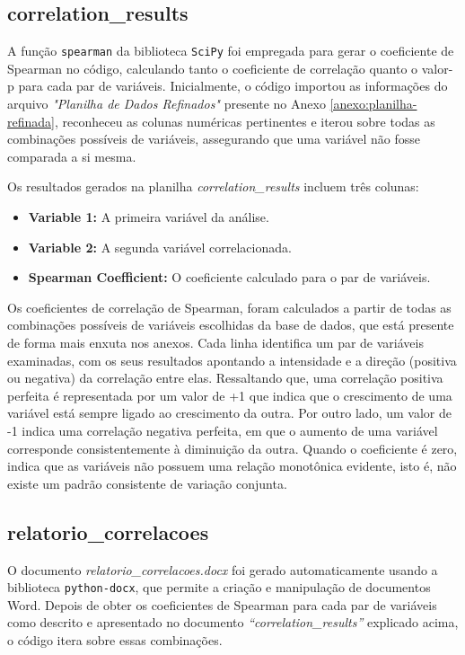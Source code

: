 \subsection*{correlation\_results}

A função \texttt{spearman} da biblioteca \texttt{SciPy} foi empregada para gerar o coeficiente de Spearman no código, calculando tanto o coeficiente de correlação quanto o valor-p para cada par de variáveis. Inicialmente, o código importou as informações do arquivo \textit{"Planilha de Dados Refinados"} presente no Anexo \ref{anexo:planilha-refinada}, reconheceu as colunas numéricas pertinentes e iterou sobre todas as combinações possíveis de variáveis, assegurando que uma variável não fosse comparada a si mesma.

Os resultados gerados na planilha \textit{correlation\_results} incluem três colunas:
\begin{itemize}
    \item \textbf{Variable 1:} A primeira variável da análise.
    \item \textbf{Variable 2:} A segunda variável correlacionada.
    \item \textbf{Spearman Coefficient:} O coeficiente calculado para o par de variáveis.
\end{itemize}

Os coeficientes de correlação de Spearman, foram calculados a partir de todas as combinações possíveis de variáveis escolhidas da base de dados, que está presente de forma mais enxuta nos anexos. Cada linha identifica um par de variáveis examinadas, com os seus resultados apontando a intensidade e a direção (positiva ou negativa) da correlação entre elas. Ressaltando que, uma correlação positiva perfeita é representada por um valor de +1 que indica que o crescimento de uma variável está sempre ligado ao crescimento da outra. Por outro lado, um valor de -1 indica uma correlação negativa perfeita, em que o aumento de uma variável corresponde consistentemente à diminuição da outra. Quando o coeficiente é zero, indica que as variáveis não possuem uma relação monotônica evidente, isto é, não existe um padrão consistente de variação conjunta. 

\subsection*{relatorio\_correlacoes}

O documento \textit{relatorio\_correlacoes.docx} foi gerado automaticamente usando a biblioteca \texttt{python-docx}, que permite a criação e manipulação de documentos Word. Depois de obter os coeficientes de Spearman para cada par de variáveis como descrito e apresentado no documento \textit{“correlation\_results”} explicado acima, o código itera sobre essas combinações. 

